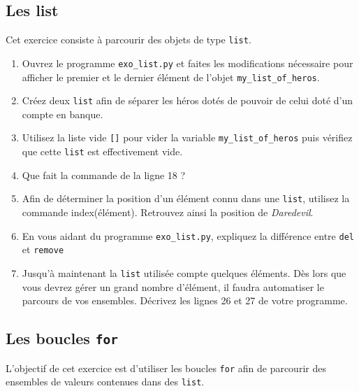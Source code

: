 \subsection{Les list}


Cet exercice consiste à parcourir des objets de type \texttt{list}.

\begin{enumerate}
\item Ouvrez le programme \texttt{exo\_list.py} et faites les modifications nécessaire pour
  afficher le premier et le dernier élément de l'objet \texttt{my\_list\_of\_heros}.
\item Créez deux \texttt{list} afin de séparer les héros dotés de pouvoir de
  celui doté d'un compte en banque.
\item Utilisez la liste vide \texttt{[]} pour vider la variable \texttt{my\_list\_of\_heros} puis vérifiez que cette
  \texttt{list} est effectivement vide.
\item Que fait la commande de la ligne 18 ?
\item Afin de déterminer la position d'un élément connu dans une \texttt{list}, utilisez la commande index(élément).
  Retrouvez ainsi la position de \textit{Daredevil}.

\item En vous aidant du programme \texttt{exo\_list.py}, expliquez la différence entre \texttt{del} et \texttt{remove}

\item Jusqu'à maintenant la \texttt{list} utilisée compte quelques éléments. Dès lors
  que vous devrez gérer un grand nombre d'élément, il faudra automatiser le parcours de vos ensembles.
  Décrivez les lignes 26 et 27 de votre programme.





\end{enumerate}



\subsection{Les boucles \texttt{for}}

L'objectif de cet exercice est d'utiliser les boucles \texttt{for} afin de
parcourir des ensembles de valeurs contenues dans des \texttt{list}.



